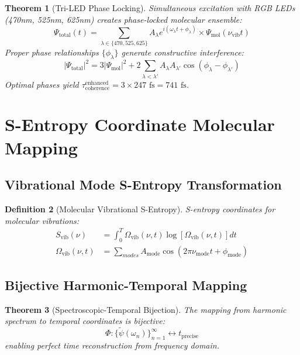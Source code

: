 \documentclass[12pt,a4paper]{article}
\newtheorem{theorem}{Theorem}[section]
\newtheorem{definition}[theorem]{Definition}
\begin{document}
\begin{theorem}[Tri-LED Phase Locking]
Simultaneous excitation with RGB LEDs (470nm, 525nm, 625nm) creates phase-locked molecular ensemble:
\begin{equation}
\Psi_{\text{total}}(t) = \sum_{\lambda \in \{470, 525, 625\}} A_\lambda e^{i(\omega_\lambda t + \phi_\lambda)} \times \Psi_{\text{mol}}(\nu_{\text{vib}} t)
\end{equation}
Proper phase relationships $\{\phi_\lambda\}$ generate constructive interference:
\begin{equation}
|\Psi_{\text{total}}|^2 = 3 |\Psi_{\text{mol}}|^2 + 2\sum_{\lambda < \lambda'} A_\lambda A_{\lambda'} \cos(\phi_\lambda - \phi_{\lambda'})
\end{equation}
Optimal phases yield $\tau_{\text{coherence}}^{\text{enhanced}} = 3 \times 247 \text{ fs} = 741 \text{ fs}$.
\end{theorem}

\section{S-Entropy Coordinate Molecular Mapping}

\subsection{Vibrational Mode S-Entropy Transformation}

\begin{definition}[Molecular Vibrational S-Entropy]
S-entropy coordinates for molecular vibrations:
\begin{align}
S_{\text{vib}}(\nu) &= \int_0^T \Omega_{\text{vib}}(\nu, t) \log[\Omega_{\text{vib}}(\nu, t)] dt \\
\Omega_{\text{vib}}(\nu, t) &= \sum_{modes} A_{\text{mode}} \cos(2\pi\nu_{\text{mode}} t + \phi_{\text{mode}})
\end{align}
\end{definition}

\subsection{Bijective Harmonic-Temporal Mapping}

\begin{theorem}[Spectroscopic-Temporal Bijection]
The mapping from harmonic spectrum to temporal coordinates is bijective:
\begin{equation}
\Phi: \{\tilde{\psi}(\omega_n)\}_{n=1}^{\infty} \leftrightarrow t_{\text{precise}}
\end{equation}
enabling perfect time reconstruction from frequency domain.
\end{theorem}
\end{document}
